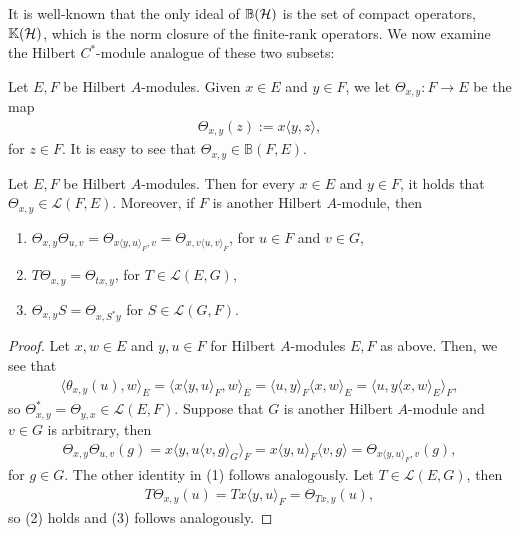 It is well-known that the only ideal of $\mathbb{B}(\mathcal{H})$ is the set of compact operators, $\mathbb{K}(\mathcal{H})$, which is the norm closure of the finite-rank operators. We now examine the Hilbert $C^*$-module analogue of these two subsets:
\begin{definition}
	Let $E,F$ be Hilbert $A$-modules. Given $x \in E$ and $y \in F$, we let $\Theta_{x,y} \colon F \to E$ be the map
	\begin{align*}
		\Theta_{x,y}(z):=x \langle y,z \rangle,
	\end{align*}
	for $z \in F$. It is easy to see that $\Theta_{x,y} \in \mathbb{B}(F,E)$. 
\end{definition}
\begin{proposition}
	Let $E,F$ be Hilbert $A$-modules. Then for every $x \in E$ and $y \in F$, it holds that $\Theta_{x,y} \in \mathcal{L}(F,E)$. Moreover, if $F$ is another Hilbert $A$-module, then
	\begin{enumerate}
		\item $\Theta_{x,y}\Theta_{u,v}=\Theta_{x \langle y,u \rangle_F,v} = \Theta_{x,v \langle u,v\rangle_F}$, for $u \in F$ and $v \in G$,
		\item $T \Theta_{x,y} = \Theta_{tx,y}$, for $T \in \mathcal{L}(E,G)$,
		\item $\Theta_{x,y}S = \Theta_{x,S^* y}$ for $S \in \mathcal{L}(G,F)$.
	\end{enumerate}
	\label{frnkideal}
\end{proposition}
\begin{proof}
Let $x,w \in E$ and $y,u \in F$ for Hilbert $A$-modules $E,F$ as above. Then, we see that
\begin{align*}
		\langle \theta_{x,y}(u),w\rangle_E = \langle x \langle y,u\rangle_{F}, w\rangle_{E} = \langle u,y \rangle_F \langle x,w\rangle_E = \langle u, y\langle x,w\rangle_E \rangle_F,
\end{align*}
so $\Theta_{x,y}^* = \Theta_{y,x} \in \mathcal{L}(E,F)$. Suppose that $G$ is another Hilbert $A$-module and $v \in G$ is arbitrary, then
\begin{align*}
	\Theta_{x,y}\Theta_{u,v}(g) = x \langle y, u \langle v,g \rangle_G \rangle_F = x \langle y, u \rangle_F \langle v,g \rangle=\Theta_{x \langle y,u \rangle_F, v}(g),
\end{align*}
for $g \in G$. The other identity in (1) follows analogously. Let $T \in \mathcal{L}(E,G)$, then
\begin{align*}
	T \Theta_{x,y}(u) = T x \langle y,u \rangle_F = \Theta_{Tx,y}(u),
\end{align*}
so (2) holds and (3) follows analogously.
\end{proof}
